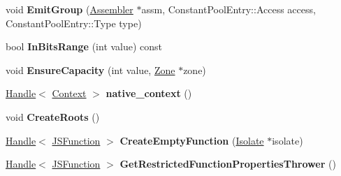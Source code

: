 \begin{DoxyCompactItemize}
\item 
void {\bfseries Emit\+Group} (\hyperlink{classv8_1_1internal_1_1_assembler}{Assembler} $\ast$assm, Constant\+Pool\+Entry\+::\+Access access, Constant\+Pool\+Entry\+::\+Type type)\hypertarget{classv8_1_1internal_1_1_b_a_s_e___e_m_b_e_d_d_e_d_a23aa09b89901984867ea6eea2332a54e}{}\label{classv8_1_1internal_1_1_b_a_s_e___e_m_b_e_d_d_e_d_a23aa09b89901984867ea6eea2332a54e}

\item 
bool {\bfseries In\+Bits\+Range} (int value) const \hypertarget{classv8_1_1internal_1_1_b_a_s_e___e_m_b_e_d_d_e_d_af72d4fca5bc37d075e527ee3000f3c39}{}\label{classv8_1_1internal_1_1_b_a_s_e___e_m_b_e_d_d_e_d_af72d4fca5bc37d075e527ee3000f3c39}

\item 
void {\bfseries Ensure\+Capacity} (int value, \hyperlink{classv8_1_1internal_1_1_zone}{Zone} $\ast$zone)\hypertarget{classv8_1_1internal_1_1_b_a_s_e___e_m_b_e_d_d_e_d_a3743b4a0d5f7462c63977c0517a4d5e7}{}\label{classv8_1_1internal_1_1_b_a_s_e___e_m_b_e_d_d_e_d_a3743b4a0d5f7462c63977c0517a4d5e7}

\item 
\hyperlink{classv8_1_1internal_1_1_handle}{Handle}$<$ \hyperlink{classv8_1_1internal_1_1_context}{Context} $>$ {\bfseries native\+\_\+context} ()\hypertarget{classv8_1_1internal_1_1_b_a_s_e___e_m_b_e_d_d_e_d_a6231937ce22bcd4aad280f31f5f6d1ed}{}\label{classv8_1_1internal_1_1_b_a_s_e___e_m_b_e_d_d_e_d_a6231937ce22bcd4aad280f31f5f6d1ed}

\item 
void {\bfseries Create\+Roots} ()\hypertarget{classv8_1_1internal_1_1_b_a_s_e___e_m_b_e_d_d_e_d_a8e501f64a59122e2a4e9ab4c8630dc4d}{}\label{classv8_1_1internal_1_1_b_a_s_e___e_m_b_e_d_d_e_d_a8e501f64a59122e2a4e9ab4c8630dc4d}

\item 
\hyperlink{classv8_1_1internal_1_1_handle}{Handle}$<$ \hyperlink{classv8_1_1internal_1_1_j_s_function}{J\+S\+Function} $>$ {\bfseries Create\+Empty\+Function} (\hyperlink{classv8_1_1internal_1_1_isolate}{Isolate} $\ast$isolate)\hypertarget{classv8_1_1internal_1_1_b_a_s_e___e_m_b_e_d_d_e_d_adc04437e49151e9941f54c13972bded4}{}\label{classv8_1_1internal_1_1_b_a_s_e___e_m_b_e_d_d_e_d_adc04437e49151e9941f54c13972bded4}

\item 
\hyperlink{classv8_1_1internal_1_1_handle}{Handle}$<$ \hyperlink{classv8_1_1internal_1_1_j_s_function}{J\+S\+Function} $>$ {\bfseries Get\+Restricted\+Function\+Properties\+Thrower} ()\hypertarget{classv8_1_1internal_1_1_b_a_s_e___e_m_b_e_d_d_e_d_a1221ab8ea3d4d5c82e87b75691486cff}{}\label{classv8_1_1internal_1_1_b_a_s_e___e_m_b_e_d_d_e_d_a1221ab8ea3d4d5c82e87b75691486cff}


\end{DoxyCompactItemize}
